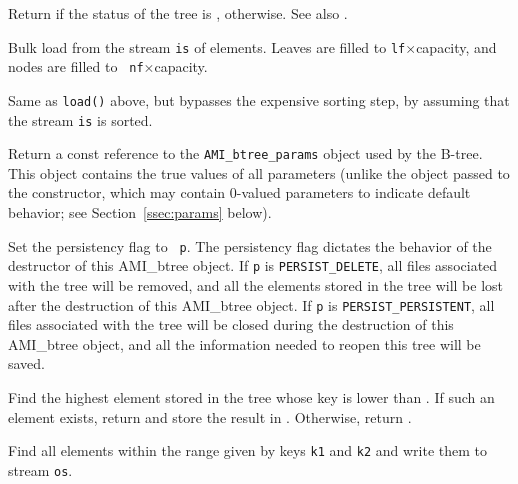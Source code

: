     {Return  if the status
   of the tree is , 
   otherwise. See also .}

    {Bulk load from the stream {\tt is} of elements. Leaves
   are filled to {\tt lf}$\times$capacity, and nodes are filled to {\tt
   nf}$\times$capacity.}


    {Same as {\tt load()} above, but bypasses the
   expensive sorting step, by assuming that the stream {\tt is} is sorted.}

    {Return a const
   reference to the {\tt AMI\_btree\_params} object used by the B-tree. This
   object contains the true values of all parameters (unlike the object
   passed to the constructor, which may contain $0$-valued parameters to
   indicate default behavior; see Section~\ref{ssec:params} below).}

    {Set the persistency flag to {\tt
   p}. The persistency flag dictates the behavior of the destructor of
   this AMI\_btree object. If {\tt p} is {\tt PERSIST\_DELETE}, all files
   associated with the tree will be removed, and all the elements stored in
   the tree will be lost after the destruction of this AMI\_btree object. If
   {\tt p} is {\tt PERSIST\_PERSISTENT}, all files associated with the tree
   will be closed during the destruction of this AMI\_btree object, and all the
   information needed to reopen this tree will be saved.}

    {Find the highest
   element stored in the tree whose key is lower than . If such
   an element exists, return  and store the result in
   . Otherwise, return .}

    {Find all elements within the range given by
   keys {\tt k1} and {\tt k2} and write them to stream {\tt os}.}

